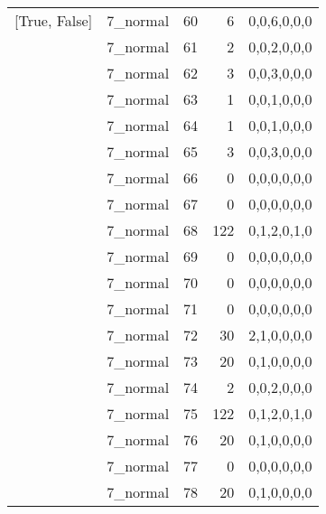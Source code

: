 \begin{tabular}{llrrl}
 [True, False]   & 7\_normal            &            60 &                     6 & 0,0,6,0,0,0   \\
 [True, False]   & 7\_normal            &            61 &                     2 & 0,0,2,0,0,0   \\
 [True, False]   & 7\_normal            &            62 &                     3 & 0,0,3,0,0,0   \\
 [True, False]   & 7\_normal            &            63 &                     1 & 0,0,1,0,0,0   \\
 [True, False]   & 7\_normal            &            64 &                     1 & 0,0,1,0,0,0   \\
 [True, False]   & 7\_normal            &            65 &                     3 & 0,0,3,0,0,0   \\
 [True, False]   & 7\_normal            &            66 &                     0 & 0,0,0,0,0,0   \\
 [True, False]   & 7\_normal            &            67 &                     0 & 0,0,0,0,0,0   \\
 [True, False]   & 7\_normal            &            68 &                   122 & 0,1,2,0,1,0   \\
 [True, False]   & 7\_normal            &            69 &                     0 & 0,0,0,0,0,0   \\
 [True, False]   & 7\_normal            &            70 &                     0 & 0,0,0,0,0,0   \\
 [True, False]   & 7\_normal            &            71 &                     0 & 0,0,0,0,0,0   \\
 [True, False]   & 7\_normal            &            72 &                    30 & 2,1,0,0,0,0   \\
 [True, False]   & 7\_normal            &            73 &                    20 & 0,1,0,0,0,0   \\
 [True, False]   & 7\_normal            &            74 &                     2 & 0,0,2,0,0,0   \\
 [True, False]   & 7\_normal            &            75 &                   122 & 0,1,2,0,1,0   \\
 [True, False]   & 7\_normal            &            76 &                    20 & 0,1,0,0,0,0   \\
 [True, False]   & 7\_normal            &            77 &                     0 & 0,0,0,0,0,0   \\
 [True, False]   & 7\_normal            &            78 &                    20 & 0,1,0,0,0,0   \\

\end{tabular}
